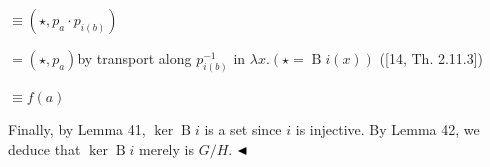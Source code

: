 \par  \quad  \quad  $\displaystyle\equiv(\star,p_{a}\cdot p_{i(b)})$\quad  \quad  
 
\par  \quad  \quad  $\displaystyle=(\star,p_{a})$\quad  by transport along $p_{i(b)}^{-1}$ in $\lambda x.(\star=\operatorname{B}i(x))$ ([14, Th. 2.11.3])\quad  \quad  
 
\par  \quad  \quad  $\displaystyle\equiv f(a)$\quad  \quad  
  
Finally, by Lemma 41, $\ker\operatorname{B}i$ is a set since $i$ is injective. By Lemma 42, we deduce that $\ker\operatorname{B}i$ merely is $G/H$. $\hfill\blacktriangleleft$\par
 
 
 
